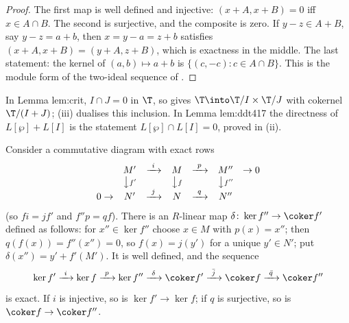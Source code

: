 \begin{proof}
The first map is well defined and injective: $(x+A,x+B)=0$ iff $x\in A\cap B$. The second is surjective, and the composite
is zero. If $y-z\in A+B$, say $y-z=a+b$, then $x=y-a=z+b$ satisfies $(x+A,x+B)=(y+A,z+B)$, which is exactness in the
middle. The last statement: the kernel of $(a,b)\mapsto a+b$ is $\{(c,-c):c\in A\cap B\}$. This is the module form of the
two-ideal sequence of .
\end{proof}

\begin{paperlink}\label{pl:modules:two-submodules}
In Lemma lem:crit, $I\cap J=0$ in $\T$, so  gives $\T\into\T/I\times\T/J$ with cokernel
$\T/(I+J)$; (iii) dualises this inclusion. In Lemma lem:ddt417 the directness of
$L[\wp]+L[I]$ is the statement $L[\wp]\cap L[I]=0$, proved in (ii).
\end{paperlink}

\begin{lemma}\label{lem:modules:snake}
Consider a commutative diagram with exact rows
\[
\begin{array}{ccccccc}
 & M' & \xrightarrow{\ i\ } & M & \xrightarrow{\ p\ } & M'' & \to 0\\
 & \big\downarrow{\scriptstyle f'} & & \big\downarrow{\scriptstyle f} & & \big\downarrow{\scriptstyle f''} & \\
0\to & N' & \xrightarrow{\ j\ } & N & \xrightarrow{\ q\ } & N'' &
\end{array}
\]
(so $fi=jf'$ and $f''p=qf$). There is an $R$-linear map $\delta\colon\ker f''\to\coker f'$ defined as follows: for
$x''\in\ker f''$ choose $x\in M$ with $p(x)=x''$; then $q(f(x))=f''(x'')=0$, so $f(x)=j(y')$ for a unique $y'\in N'$; put
$\delta(x'')=y'+f'(M')$. It is well defined, and the sequence
\[
\ker f'\xrightarrow{\ i\ }\ker f\xrightarrow{\ p\ }\ker f''\xrightarrow{\ \delta\ }\coker f'\xrightarrow{\ \bar j\ }\coker f\xrightarrow{\ \bar q\ }\coker f''
\]
is exact. If $i$ is injective, so is $\ker f'\to\ker f$; if $q$ is surjective, so is $\coker f\to\coker f''$.
\end{lemma}

